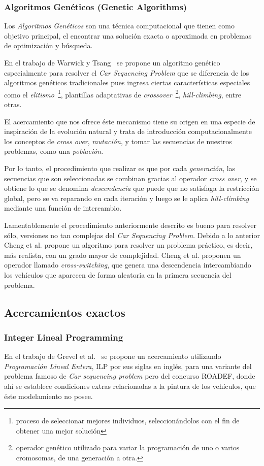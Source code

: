 \subsubsection{Algoritmos Genéticos (Genetic Algorithms)}
Los \emph{Algoritmos Genéticos} son una técnica computacional que tienen como objetivo principal,
el encontrar una solución exacta o aproximada en problemas de optimización y búsqueda.

En el trabajo de Warwick y Tsang~\cite{WT95} se propone un algoritmo genético especialmente
para resolver el \emph{Car Sequencing Problem} que se diferencia de los algoritmos genéticos
tradicionales pues ingresa ciertas características especiales como el \emph{elitismo}~\footnote{
proceso de seleccionar mejores individuos, seleccionándolos con el fin de obtener una mejor solución
}, plantillas adaptativas de \emph{crossover}~\footnote{
operador genético utilizado para variar la programación de uno o varios cromosomas, de una generación  a otra.
}, \emph{hill-climbing}, entre otras.

El acercamiento que nos ofrece éste mecanismo tiene su origen en una especie de inspiración
de la evolución natural y trata de introducción computacionalmente los conceptos de \emph{cross over},
\emph{mutación}, y tomar las secuencias de nuestros problemas, como una \emph{población}.

Por lo tanto, el procedimiento que realizar es que por cada \emph{generación}, las secuencias
que son seleccionadas se combinan gracias al operador \emph{cross over}, y se obtiene lo
que se denomina \emph{descendencia} que puede que no satisfaga la restricción global,
pero se va reparando en cada iteración y luego se le aplica \emph{hill-climbing} mediante
una función de intercambio.

Lamentablemente el procedimiento anteriormente descrito es bueno para resolver sólo,
versiones no tan complejas del \emph{Car Sequencing Problem}.
Debido a lo anterior Cheng et al. \cite{CLP+99} propone un algoritmo para resolver un
problema práctico, es decir, más realista, con un grado mayor de complejidad.
Cheng et al. \cite{CLP+99} proponen un operador llamado \emph{cross-switching},
que genera una descendencia intercambiando los vehículos que aparecen de forma aleatoria
en la primera secuencia del problema.

\subsection{Acercamientos exactos}
\subsubsection{Integer Lineal Programming}
En el trabajo de Grevel et al.~\cite{4} se propone un acercamiento utilizando
\emph{Programación Lineal Entera}, ILP por sus siglas en inglés,  para una variante
del problema famoso de \emph{Car sequencing problem} pero del concurso ROADEF,
donde ahí se establece condiciones extras relacionadas a la pintura de los vehículos,
que éste modelamiento no posee.

